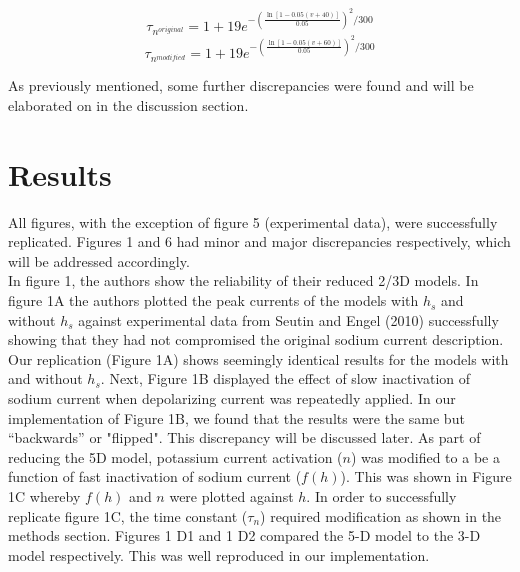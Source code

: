 \begin{center}
	$$\tau_{n^{original}} = 1 + 19 e^{- (\frac{{\ln[1 - 0.05 (v+40)]}}{0.05})^{2}/300}$$
	$$\tau_{n^{modified}} = 1 + 19 e^{- (\frac{{\ln[1 - 0.05 (v+60)]}}{0.05})^{2}/300}$$
\end{center}

As previously mentioned, some further discrepancies were found and will be elaborated on in the discussion section. 


\section{Results}

All figures, with the exception of figure 5 (experimental data), were successfully replicated. Figures 1 and 6 had minor and major discrepancies respectively, which will be addressed accordingly.\\  
In figure 1, the authors show the reliability of their reduced 2/3D models. In figure 1A the authors plotted the peak currents of the models with $h_{s}$ and without $h_{s}$ against experimental data from Seutin and Engel (2010) successfully showing that they had not compromised the original sodium current description.  Our replication (Figure 1A) shows seemingly identical results for the models with and without $h_{s}$. Next, Figure 1B displayed the effect of slow inactivation of sodium current when depolarizing current was repeatedly applied. In our implementation of Figure 1B, we found that the results were the same but “backwards” or "flipped". This discrepancy will be discussed later. As part of reducing the 5D model, potassium current activation ($n$) was modified to a be a function of fast inactivation of sodium current ($f(h)$). This was shown in Figure 1C whereby $f(h)$ and $n$ were plotted against $h$. In order to successfully replicate figure 1C, the time constant ($\tau_n$) required modification as shown in the methods section. Figures 1 D1 and 1 D2 compared the 5-D model to the 3-D model respectively. This was well reproduced in our implementation.\\ 

